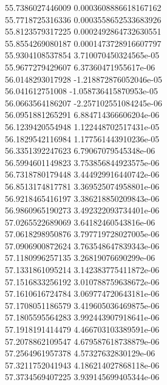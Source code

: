 {55.7386027446009 0.0003608886618167162 \\
55.7718725316336 0.0003558652533683926 \\
55.8123579317225 0.0002492864732630551 \\
55.8554269080187 0.0001473728916607797 \\
55.9304108537854 3.710070450324565e-05 \\
55.9677279429607 6.37360471955617e-06 \\
56.0148293017928 -1.218872876052046e-05 \\
56.041612751008 -1.058736415870953e-05 \\
56.0663564186207 -2.257102551084245e-06 \\
56.0951881265291 6.884714366606204e-06 \\
56.1239420554948 1.122448702517431e-05 \\
56.1829542116984 1.177561443910236e-05 \\
56.3351392247623 6.79067079545348e-06 \\
56.5994601149823 3.753856844923575e-06 \\
56.7318780179448 3.444929916440742e-06 \\
56.8513174817781 3.369525074958801e-06 \\
56.9218465416197 3.386218850209843e-06 \\
56.9860965190273 3.492322093734401e-06 \\
57.0265522689069 3.64182460543816e-06 \\
57.0618298950876 3.797719728027005e-06 \\
57.0906900872624 3.763548647839343e-06 \\
57.1180996257135 3.26819076690299e-06 \\
57.1331861095214 3.142383775411872e-06 \\
57.1516833256192 3.010788759638672e-06 \\
57.1610616724784 3.069774720643181e-06 \\
57.1708051186579 3.419605036469875e-06 \\
57.1805595564283 3.992443907918641e-06 \\
57.1918191414479 4.466703103389591e-06 \\
57.2078862109547 4.679587618738879e-06 \\
57.2564961957378 4.57327632830129e-06 \\
57.3211752041943 4.186214027868118e-06 \\
57.3734569407225 3.939145699405344e-06 \\
}

